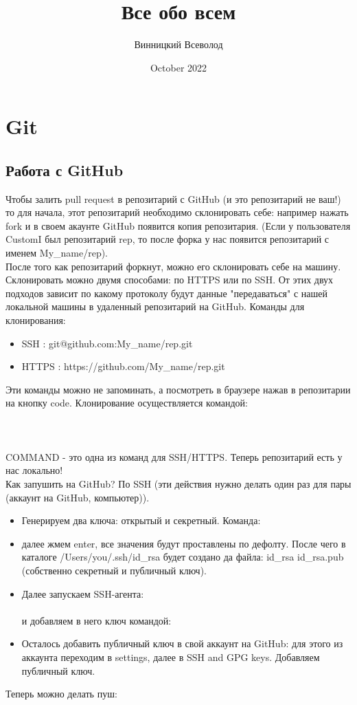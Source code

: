 \documentclass{article}
\title{Все обо всем}
\author{Винницкий Всеволод}
\date{October 2022}
\begin{document}
\maketitle

\section{Git}
\subsection{Работа с GitHub}
Чтобы залить pull request в репозитарий с GitHub (и это репозитарий не ваш!) то для начала, этот репозитарий необходимо склонировать себе: например нажать fork и в своем акаунте GitHub появится копия репозитария. (Если у пользователя CustomI был репозитарий rep, то после форка у нас появится репозитарий с именем My\_name/rep). \\
После того как репозитарий форкнут, можно его склонировать себе на машину. Склонировать можно двумя способами: по HTTPS или по SSH. От этих двух подходов зависит по какому протоколу будут данные "передаваться" с нашей локальной машины в удаленный репозитарий на GitHub.
Команды для клонирования:
\begin{itemize}
\item SSH : git@github.com:My\_name/rep.git
\item HTTPS : https://github.com/My\_name/rep.git
\end{itemize}

Эти команды можно не запоминать, а посмотреть в браузере нажав в репозитарии на кнопку code. Клонирование осуществляется командой:
\\
\\
\\
\\
COMMAND - это одна из команд для SSH/HTTPS. Теперь репозитарий есть у нас локально!
\\
Как запушить на GitHub?
По SSH (эти действия нужно делать один раз для пары (аккаунт на GitHub, компьютер)). 

\begin{itemize}
\item Генерируем два ключа: открытый и секретный. Команда:
\\
\item далее жмем enter, все значения будут проставлены по дефолту. После чего в каталоге /Users/you/.ssh/id\_rsa будет создано да файла: id\_rsa id\_rsa.pub (собственно секретный и публичный ключ).

\item Далее запускаем SSH-агента:
\\
\\
и добавляем в него ключ командой:
\\
\item Осталось добавить публичный ключ в свой аккаунт на GitHub: для этого из аккаунта переходим в settings, далее в SSH and GPG keys. Добавляем публичный ключ.
\end{itemize}

Теперь можно делать пуш: 
\end{document}
